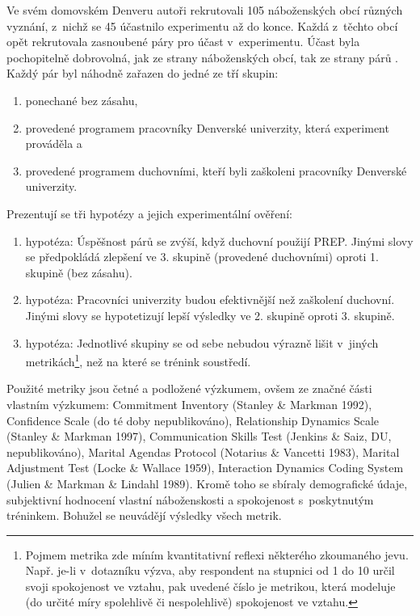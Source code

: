 Ve svém domovském Denveru autoři rekrutovali 105 náboženských obcí různých
vyznání, z~nichž se 45 účastnilo experimentu až do konce. Každá z~těchto obcí
opět rekrutovala zasnoubené páry pro účast v~experimentu. Účast byla
pochopitelně dobrovolná, jak ze strany náboženských obcí, tak ze strany párů%
. Každý
pár byl náhodně zařazen do jedné ze tří skupin:
\begin{enumerate}
  \item{ponechané bez zásahu,}
  \item{
    provedené programem pracovníky Denverské univerzity, která experiment
    prováděla a
  }
  \item{
    provedené programem duchovními, kteří byli zaškoleni pracovníky Denverské
    univerzity.
  }
\end{enumerate}

Prezentují se tři hypotézy a jejich experimentální ověření:
\begin{enumerate}
  \item{
    hypotéza: Úspěšnost párů se zvýší, když duchovní použijí PREP. Jinými slovy
    se předpokládá zlepšení ve 3. skupině (provedené duchovními) oproti 1.
    skupině (bez zásahu).
  }
  \item{
    hypotéza: Pracovníci univerzity budou efektivnější než zaškolení duchovní.
    Jinými slovy se hypotetizují lepší výsledky ve 2. skupině oproti 3. skupině.
  }
  \item{
    hypotéza: Jednotlivé skupiny se od sebe nebudou výrazně lišit v~jiných
    metrikách\footnote{%
      Pojmem metrika zde míním kvantitativní reflexi některého zkoumaného jevu.
      Např. je-li v~dotazníku výzva, aby respondent na stupnici od 1 do 10 určil
      svoji spokojenost ve vztahu, pak uvedené číslo je metrikou, která modeluje
      (do určité míry spolehlivě či nespolehlivě) spokojenost ve vztahu.
    }, než na které se trénink soustředí.
  }
\end{enumerate}

Použité metriky jsou četné a podložené výzkumem, ovšem ze značné části vlastním
výzkumem: Commitment Inventory (Stanley \& Markman
1992\cite{stanley1992assessing}), Confidence Scale (do té doby nepublikováno),
Relationship Dynamics Scale (Stanley \& Markman 1997\cite{stanley1997marriage}),
Communication Skills Test (Jenkins \& Saiz, DU, nepublikováno), Marital Agendas
Protocol (Notarius \& Vancetti 1983\cite{notarius1983marital}), Marital
Adjustment Test (Locke \& Wallace 1959\cite{locke1959short}), Interaction
Dynamics Coding System (Julien \& Markman \& Lindahl
1989\cite{julien1989comparison}). Kromě toho se sbíraly demografické údaje,
subjektivní hodnocení vlastní náboženskosti a spokojenost s~poskytnutým
tréninkem. Bohužel se neuvádějí výsledky všech metrik.

